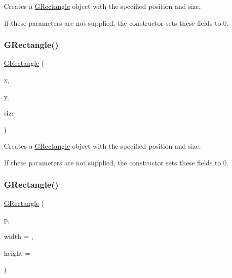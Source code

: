 Creates a {\ttfamily \mbox{\hyperlink{classGRectangle}{G\+Rectangle}}} object with the specified position and size. 

If these parameters are not supplied, the constructor sets these fields to 0. \mbox{\label{classGRectangle_abf6b4d32650748215930e562ffbfb220}} 
\subsubsection{\texorpdfstring{G\+Rectangle()}{GRectangle()}\hspace{0.1cm}{\footnotesize\ttfamily [2/4]}}
{\footnotesize\ttfamily \mbox{\hyperlink{classGRectangle}{G\+Rectangle}} (\begin{DoxyParamCaption}\item[{double}]{x,  }\item[{double}]{y,  }\item[{const \mbox{\hyperlink{classGDimension}{G\+Dimension}} \&}]{size }\end{DoxyParamCaption})}



Creates a {\ttfamily \mbox{\hyperlink{classGRectangle}{G\+Rectangle}}} object with the specified position and size. 

If these parameters are not supplied, the constructor sets these fields to 0. \mbox{\label{classGRectangle_a68fa0886a48ee516b8897997c767e504}} 
\subsubsection{\texorpdfstring{G\+Rectangle()}{GRectangle()}\hspace{0.1cm}{\footnotesize\ttfamily [3/4]}}
{\footnotesize\ttfamily \mbox{\hyperlink{classGRectangle}{G\+Rectangle}} (\begin{DoxyParamCaption}\item[{const \mbox{\hyperlink{classGPoint}{G\+Point}} \&}]{p,  }\item[{double}]{width = {},  }\item[{double}]{height = {} }\end{DoxyParamCaption})}



